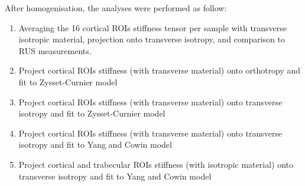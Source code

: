 \documentclass[a4paper,fleqn]{DC_ArtStyle}
\begin{document}
	After homogenisation, the analyses were performed as follow:
	\begin{enumerate}
		\item Averaging the 16 cortical ROIs stiffness tensor per sample with transverse isotropic material, projection onto transverse isotropy, and comparison to RUS measurements.
		\item Project cortical ROIs stiffness (with transverse material) onto orthotropy and fit to Zysset-Curnier model
		\item Project cortical ROIs stiffness (with transverse material) onto transverse isotropy and fit to Zysset-Curnier model
		\item Project cortical ROIs stiffness (with transverse material) onto transverse isotropy and fit to Yang and Cowin model
		\item Project cortical and trabecular ROIs stiffness (with isotropic material) onto transverse isotropy and fit to Yang and Cowin model
	\end{enumerate}






\end{document}

